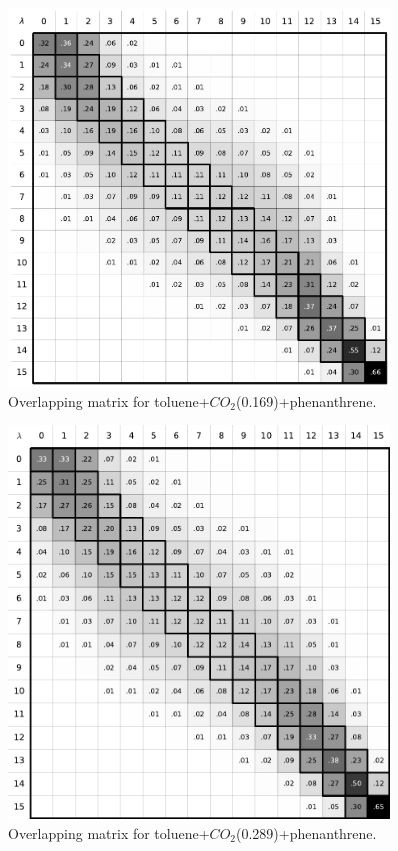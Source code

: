 \documentclass[
	12pt,				%
	openany,			%
	oneside,			%
	a4paper,			%
	english,			%
	brazil				%
	]{abntex2}
\begin{document}
\begin{apendicesenv}
\begin{figure}[H]
	\centering
	\includegraphics[width=0.9\textwidth]{Figures/otolco2_3}
	\caption{Overlapping matrix for toluene+$CO_{2}$(0.169)+phenanthrene.}
\end{figure}

\begin{figure}[H]
	\centering
	\includegraphics[width=0.9\textwidth]{Figures/otolco2_4}
	\caption{Overlapping matrix for toluene+$CO_{2}$(0.289)+phenanthrene.}
\end{figure}


\end{apendicesenv}
\end{document}
